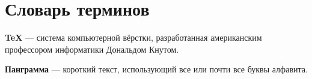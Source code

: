 \chapter*{Словарь терминов}             %

\textbf{TeX} --- система компьютерной вёрстки, разработанная американским профессором информатики Дональдом Кнутом.

\textbf{Панграмма} --- короткий текст, использующий все или почти все буквы алфавита.
